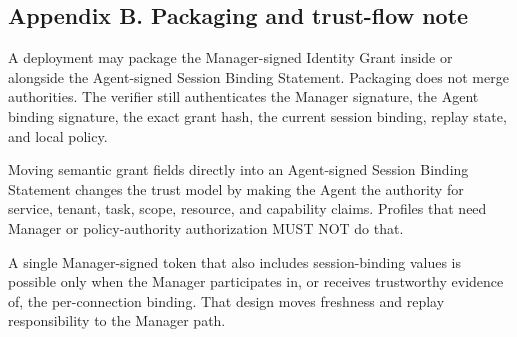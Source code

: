 \documentclass[
]{article}
\begin{document}
\subsection{Appendix B. Packaging and trust-flow
note}\label{appendix-b.-packaging-and-trust-flow-note}

A deployment may package the Manager-signed Identity Grant inside or
alongside the Agent-signed Session Binding Statement. Packaging does not
merge authorities. The verifier still authenticates the Manager
signature, the Agent binding signature, the exact grant hash, the
current session binding, replay state, and local policy.

Moving semantic grant fields directly into an Agent-signed Session
Binding Statement changes the trust model by making the Agent the
authority for service, tenant, task, scope, resource, and capability
claims. Profiles that need Manager or policy-authority authorization
MUST NOT do that.

A single Manager-signed token that also includes session-binding values
is possible only when the Manager participates in, or receives
trustworthy evidence of, the per-connection binding. That design moves
freshness and replay responsibility to the Manager path.
\end{document}
